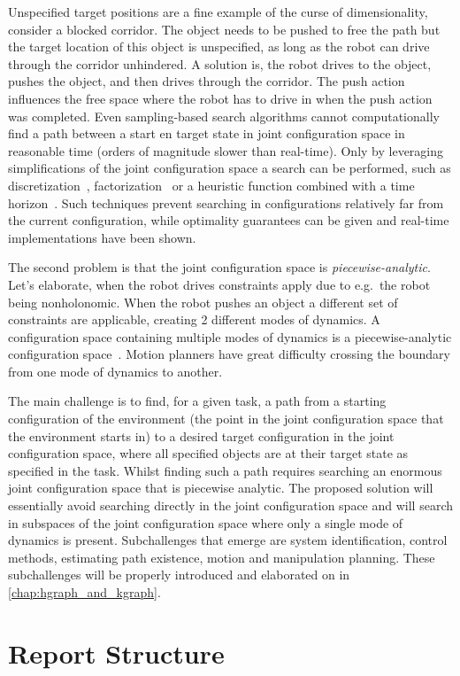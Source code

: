 Unspecified target positions are a fine example of the curse of dimensionality, consider a blocked corridor. The object needs to be pushed to free the path but the target location of this object is unspecified, as long as the robot can drive through the corridor unhindered. A solution is, the robot drives to the object, pushes the object, and then drives through the corridor. The push action influences the free space where the robot has to drive in when the push action was completed. Even sampling-based search algorithms cannot computationally find a path between a start en target state in joint configuration space in reasonable time (orders of magnitude slower than real-time). Only by leveraging simplifications of the joint configuration space a search can be performed, such as discretization~\cite{sabbaghnovin_optimal_2016}, factorization~\cite{vega-brown_asymptotically_2020} or a heuristic function combined with a time horizon~\cite{sabbaghnovin_optimal_2016}. Such techniques prevent searching in configurations relatively far from the current configuration, while optimality guarantees can be given and real-time implementations have been shown.\bs
{}

The second problem is that the joint configuration space is \textit{piecewise-analytic}. Let's elaborate, when the robot drives constraints apply due to e.g.~the robot being nonholonomic. When the robot pushes an object a different set of constraints are applicable, creating 2 different modes of dynamics. A configuration space containing multiple modes of dynamics is a piecewise-analytic configuration space~\cite{vega-brown_asymptotically_2020}. Motion planners have great difficulty crossing the boundary from one mode of dynamics to another.\bs

The main challenge is to find, for a given task, a path from a starting configuration of the environment (the point in the joint configuration space that the environment starts in) to a desired target configuration in the joint configuration space, where all specified objects are at their target state as specified in the task. Whilst finding such a path requires searching an enormous joint configuration space that is piecewise analytic. The proposed solution will essentially avoid searching directly in the joint configuration space and will search in subspaces of the joint configuration space where only a single mode of dynamics is present. Subchallenges that emerge are system identification, control methods, estimating path existence, motion and manipulation planning. These subchallenges will be properly introduced and elaborated on in \cref{chap:hgraph_and_kgraph}.\bs
{}

\section{Report Structure}%
\label{sec:report_structure}



